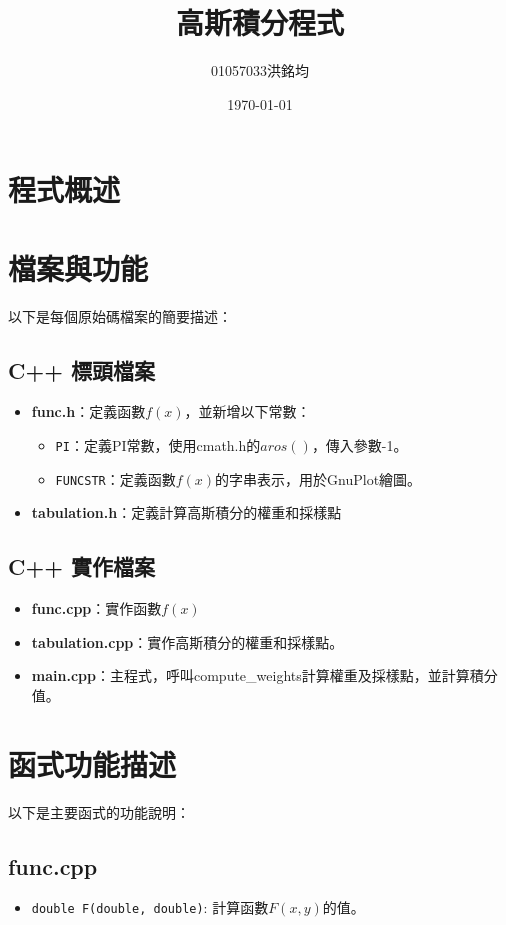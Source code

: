 \documentclass[a4paper,12pt]{article}
\title{高斯積分程式}
\author{01057033洪銘均}
\date{\today}
\begin{document}
\maketitle
\tableofcontents
\newpage

\section{程式概述}


\section{檔案與功能}
以下是每個原始碼檔案的簡要描述：

\subsection{C++ 標頭檔案}
\begin{itemize}
    \item \textbf{func.h}：定義函數$f(x)$，並新增以下常數：
    \begin{itemize}
        \item \texttt{PI}：定義PI常數，使用cmath.h的$aros()$，傳入參數-1。
        \item \texttt{FUNCSTR}：定義函數$f(x)$的字串表示，用於GnuPlot繪圖。
    \end{itemize}
    \item \textbf{tabulation.h}：定義計算高斯積分的權重和採樣點

\end{itemize}

\subsection{C++ 實作檔案}
\begin{itemize} 
    \item \textbf{func.cpp}：實作函數$f(x)$
    \item \textbf{tabulation.cpp}：實作高斯積分的權重和採樣點。
    \item \textbf{main.cpp}：主程式，呼叫compute\_weights計算權重及採樣點，並計算積分值。
\end{itemize}

\section{函式功能描述}
以下是主要函式的功能說明：

\subsection{func.cpp}
\begin{itemize}
    \item \texttt{double F(double, double)}: 計算函數$F(x, y)$的值。
\end{itemize}
\end{document}
